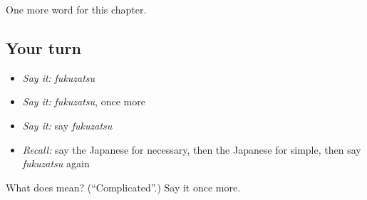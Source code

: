 \begin{grammarlens}[title={What you've built}]
One more word for this chapter.
\end{grammarlens}

\subsection*{Your turn}
\begin{itemize}
\raggedright
  \item \emph{Say it:} \emph{fukuzatsu}
  \item \emph{Say it:} \emph{fukuzatsu}, once more
  \item \emph{Say it:} say \emph{fukuzatsu}
  \item \emph{Recall:} say the Japanese for necessary, then the Japanese for simple, then say \emph{fukuzatsu} again
\end{itemize}

\begin{tcolorbox}[breakable,colback=teal!4,colframe=teal!35!black,title={Before you move on}]
What does  mean? (\textquotedblleft{}Complicated\textquotedblright{}.) Say it once more.
\end{tcolorbox}
